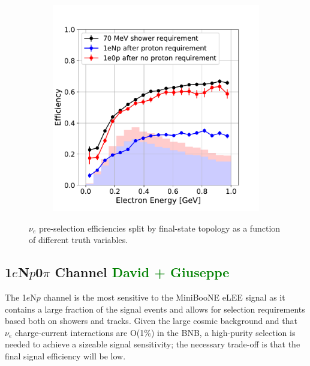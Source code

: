 \documentclass[a4paper]{article}
\newcommand{\npsel}{1$e$N$p$0$\pi$ }
\begin{document}
\begin{figure}[H]
\begin{center}
\begin{subfigure}[b]{0.3\textwidth}
    \caption{\label{fig:nue:presel:eff:proton} }
    \end{subfigure}
    \begin{subfigure}[b]{0.3\textwidth}
    \centering
    \includegraphics[width=1.00\textwidth]{nueselection/elec_RUN1.pdf}
    \caption{\label{fig:nue:presel:eff:elec} }
    \end{subfigure}
\caption{\label{fig:nue:presel:eff} $\nu_e$ pre-selection efficiencies split by final-state topology as a function of different truth variables. }
\end{center}
\end{figure}

\subsection{\npsel Channel \textcolor{green}{David + Giuseppe}}
\label{sec:nueselection:1eNp}

The 1$e$N$p$ channel is the most sensitive to the MiniBooNE eLEE signal as it contains a large fraction of the signal events and allows for selection requirements based both on showers and tracks. 
Given the large cosmic background and that $\nu_e$ charge-current interactions are O(1\%) in the BNB, a high-purity selection is needed to achieve a sizeable signal sensitivity; the necessary trade-off is that the final signal efficiency will be low.
\end{document}
